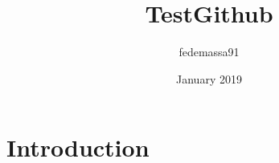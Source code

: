 \documentclass{article}
\title{TestGithub}
\author{fedemassa91 }
\date{January 2019}
\begin{document}
\maketitle

\section{Introduction}
\end{document}
